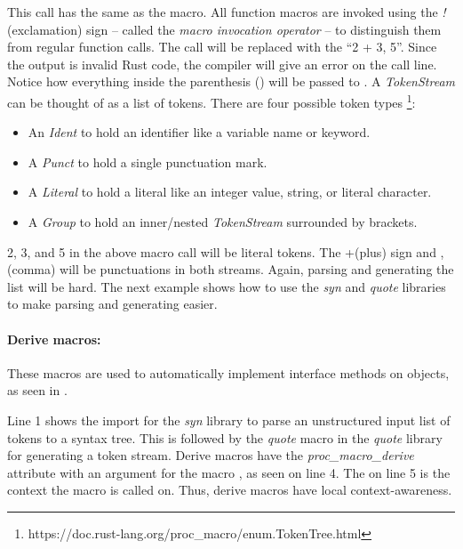 This call has the same  as the macro.
All function macros are invoked using the \textit{!} (exclamation) sign -- called the \textit{macro invocation operator} -- to distinguish them from regular function calls.
The call will be replaced with the  ``2 + 3, 5''.
Since the output is invalid Rust code, the compiler will give an error on the call line.
Notice how everything inside the parenthesis () will be passed to .
A \textit{TokenStream} can be thought of as a list of tokens.
There are four possible token types \footnote{https://doc.rust-lang.org/proc\_macro/enum.TokenTree.html}:

\begin{itemize}
	\item An \textit{Ident} to hold an identifier like a variable name or keyword.
	\item A \textit{Punct} to hold a single punctuation mark.
	\item A \textit{Literal} to hold a literal like an integer value, string, or literal character.
	\item A \textit{Group} to hold an inner/nested \textit{TokenStream} surrounded by brackets.
\end{itemize}

2, 3, and 5 in the above macro call will be literal tokens.
The +(plus) sign and ,(comma) will be punctuations in both streams.
Again, parsing and generating the list will be hard.
The next example shows how to use the \textit{syn} and \textit{quote} libraries to make parsing and generating easier.

\paragraph{Derive macros:}
These macros are used to automatically implement interface methods on objects, as seen in .


Line 1 shows the import for the \textit{syn} library to parse an unstructured input list of tokens to a syntax tree.
This is followed by the \textit{quote} macro in the \textit{quote} library for generating a token stream.
Derive macros have the \textit{proc\_macro\_derive} attribute with an argument for the macro , as seen on line 4.
The  on line 5 is the context the macro is called on.
Thus, derive macros have local context-awareness.

